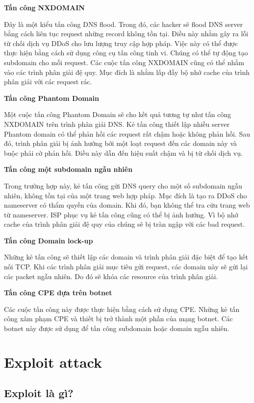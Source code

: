 \documentclass{article}
\begin{document}
\textbf{Tấn công NXDOMAIN}

Đây là một kiểu tấn công DNS flood. Trong đó, các hacker sẽ flood DNS server bằng cách liên tục request những record không tồn tại. Điều này nhằm gây ra lỗi từ chối dịch vụ DDoS cho lưu lượng truy cập hợp pháp. Việc này có thể được thực hiện bằng cách sử dụng công cụ tấn công tinh vi. Chúng có thể tự động tạo subdomain cho mỗi request. Các cuộc tấn công NXDOMAIN cũng có thể nhắm vào các trình phân giải đệ quy. Mục đích là nhằm lấp đầy bộ nhớ cache của trình phân giải với các request rác.

\textbf{Tấn công Phantom Domain}

Một cuộc tấn công Phantom Domain sẽ cho kết quả tương tự như tấn công NXDOMAIN trên trình phân giải DNS. Kẻ tấn công thiết lập nhiều server Phantom domain có thể phản hồi các request rất chậm hoặc không phản hồi. Sau đó, trình phân giải bị ảnh hưởng bởi một loạt request đến các domain này và buộc phải cờ phản hồi. Điều này dẫn đến hiệu suất chậm và bị từ chối dịch vụ.

\textbf{Tấn công một subdomain ngẫu nhiên}

Trong trường hợp này, kẻ tấn công gửi DNS query cho một số subdomain ngẫu nhiên, không tồn tại của một trang web hợp pháp. Mục đích là tạo ra DDoS cho nameserver có thẩm quyền của domain. Khi đó, bạn không thể tra cứu trang web từ nameserver. ISP phục vụ kẻ tấn công cũng có thể bị ảnh hưởng. Vì bộ nhớ cache của trình phân giải đệ quy của chúng sẽ bị tràn ngập với các bad request.

\textbf{Tấn công Domain lock-up}

Những kẻ tấn công sẽ thiết lập các domain và trình phân giải đặc biệt để tạo kết nối TCP. Khi các trình phân giải mục tiêu gửi request, các domain này sẽ gửi lại các packet ngẫu nhiên. Do đó sẽ khóa các resource của trình phân giải.

\textbf{Tấn công CPE dựa trên botnet}

Các cuộc tấn công này được thực hiện bằng cách sử dụng CPE. Những kẻ tấn công xâm phạm CPE và thiết bị trở thành một phần của mạng botnet. Các botnet này được sử dụng để tấn công subdomain hoặc domain ngẫu nhiên.

\section{Exploit attack}
\subsection{Exploit là gì?}
\end{document}
